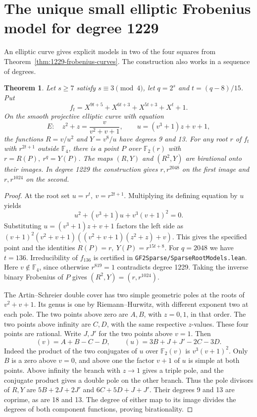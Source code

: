 \documentclass[11pt]{article}
\newtheorem{theorem}{Theorem}
\newcommand{\F}{\mathbb F_2}
\begin{document}
\section{The unique small elliptic Frobenius model for degree 1229}
\label{sec:1229-elliptic-model}
An elliptic curve gives explicit models in two of the four squares
from Theorem~\ref{thm:1229-frobenius-curves}. The construction also
works in a sequence of degrees.
\begin{theorem}\label{thm:1229-elliptic-family}
Let \(s\ge7\) satisfy \(s\equiv3\pmod4\), let \(q=2^s\) and
\(t=(q-8)/15\). Put
\[
 f_t=X^{9t+5}+X^{6t+3}+X^{5t+3}+X^t+1 .
\]
On the smooth projective elliptic curve with equation
\[
 E:\quad z^2+z=\frac{v}{v^2+v+1},\qquad
 u=(v^3+1)z+v+1,
\]
the functions \(R=v/u^2\) and \(Y=v^8/u\) have degrees 9 and 13.
For any root \(r\) of \(f_t\) with \(r^{2t+1}\) outside
\(\mathbb F_4\), there is a point \(P\) over \(\F(r)\) with
\(r=R(P),\ r^q=Y(P)\). The maps \((R,Y)\) and \((R^2,Y)\) are
birational onto their images. In degree 1229 the construction gives
\(r,r^{2048}\) on the first image and \(r,r^{1024}\) on the second.
\end{theorem}
\begin{proof}
At the root set \(u=r^t,\ v=r^{2t+1}\). Multiplying its defining
equation by \(u\) yields
\[
 u^2+(v^3+1)u+v^3(v+1)^2=0.
\]
Substituting \(u=(v^3+1)z+v+1\) factors the left side as
\((v+1)^2(v^2+v+1)((v^2+v+1)(z^2+z)+v)\). This gives the
specified point and the identities \(R(P)=r,\ Y(P)=r^{15t+8}\).
For \(q=2048\) we have \(t=136\). Irreducibility of \(f_{136}\) is
certified in \nolinkurl{GF2Sparse/SparseRootModels.lean}. Here
\(v\notin\mathbb F_4\), since otherwise \(r^{819}=1\) contradicts
degree 1229. Taking the inverse binary Frobenius of \(P\) gives
\((R^2,Y)=(r,r^{1024})\).

The Artin--Schreier double cover has two simple geometric poles at
the roots of \(v^2+v+1\). Its genus is one by Riemann--Hurwitz, with
different exponent two at each pole. The two points above zero are
\(A,B\), with \(z=0,1\), in that order. The two points above infinity
are \(C,D\), with the same respective \(z\)-values. These four points
are rational. Write \(J,J'\) for the two points above \(v=1\). Then
\[
 (v)=A+B-C-D,\qquad (u)=3B+J+J'-2C-3D .
\]
Indeed the product of the two conjugates of \(u\) over \(\F(v)\)
is \(v^3(v+1)^2\). Only \(B\) is a zero above \(v=0\), and above one
the factor \(v+1\) of \(u\) is simple at both points. Above infinity
the branch with \(z\to1\) gives a triple pole, and the conjugate
product gives a double pole on the other branch. Thus the pole
divisors of \(R,Y\) are \(5B+2J+2J'\) and \(6C+5D+J+J'\).
Their degrees 9 and 13 are coprime, as are 18 and 13. The degree of
either map to its image divides the degrees of both component
functions, proving birationality.
\end{proof}
\end{document}
